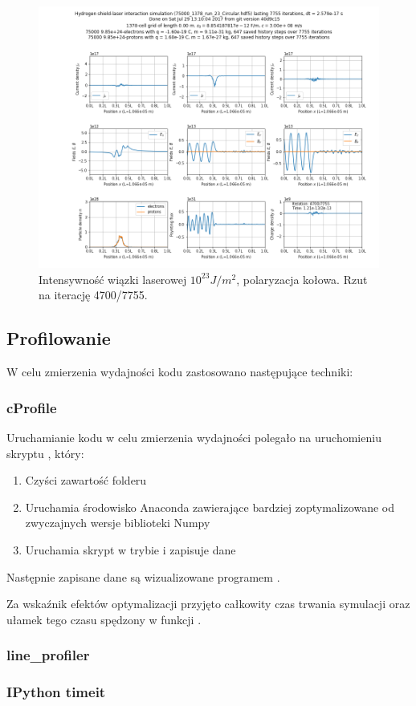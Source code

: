 \begin{figure}[h!]
  \includegraphics[width=\textwidth]{Images/75000_1378_run_23_Circular_004700}
  \caption{Intensywność wiązki laserowej $10^{23} J/m^2$, polaryzacja kołowa. Rzut na iterację 4700/7755.\label{fig:laser-23-Circular-snapshot}}
\end{figure}




\subsection{Profilowanie}
W celu zmierzenia wydajności kodu zastosowano następujące techniki:
\subsubsection{cProfile}
Uruchamianie kodu w celu zmierzenia wydajności polegało na uruchomieniu skryptu , który:
\begin{enumerate}
\item Czyści zawartość folderu 
\item Uruchamia środowisko Anaconda zawierające bardziej zoptymalizowane od zwyczajnych wersje biblioteki Numpy
\item Uruchamia skrypt  w trybie  i zapisuje dane
\end{enumerate}

Następnie zapisane dane są wizualizowane programem .

Za wskaźnik efektów optymalizacji przyjęto całkowity czas trwania symulacji oraz ułamek tego czasu spędzony w funkcji
.
\subsubsection{line\_profiler}
\subsubsection{IPython timeit}
